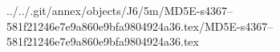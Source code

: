 ../../.git/annex/objects/J6/5m/MD5E-s4367--581f21246e7e9a860e9bfa9804924a36.tex/MD5E-s4367--581f21246e7e9a860e9bfa9804924a36.tex